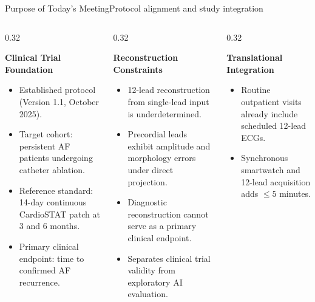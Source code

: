 \documentclass[aspectratio=169,10pt]{beamer}
\begin{document}
\begin{frame}{Purpose of Today's Meeting}{Protocol alignment and study integration}
\begin{columns}[T]
  \begin{column}{0.32\textwidth}
    \begin{block}{\textbf{Clinical Trial Foundation}}
      \scriptsize
      \begin{itemize}
        \item Established protocol (Version 1.1, October 2025).
        \item Target cohort: persistent AF patients undergoing catheter ablation.
        \item Reference standard: 14-day continuous CardioSTAT patch at 3 and 6 months.
        \item Primary clinical endpoint: time to confirmed AF recurrence.
      \end{itemize}
    \end{block}
  \end{column}
  \begin{column}{0.32\textwidth}
    \begin{block}{\textbf{Reconstruction Constraints}}
      \scriptsize
      \begin{itemize}
        \item 12-lead reconstruction from single-lead input is underdetermined.
        \item Precordial leads exhibit amplitude and morphology errors under direct projection.
        \item Diagnostic reconstruction cannot serve as a primary clinical endpoint.
        \item Separates clinical trial validity from exploratory AI evaluation.
      \end{itemize}
    \end{block}
  \end{column}
  \begin{column}{0.32\textwidth}
    \begin{block}{\textbf{Translational Integration}}
      \scriptsize
      \begin{itemize}
        \item Routine outpatient visits already include scheduled 12-lead ECGs.
        \item Synchronous smartwatch and 12-lead acquisition adds $\le 5$ minutes.

\end{itemize}
\end{block}
\end{column}
\end{columns}
\end{frame}
\end{document}
